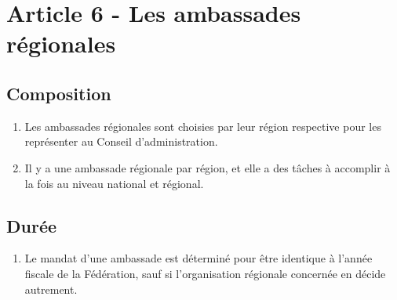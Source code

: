 \section{Article 6 - Les ambassades régionales}
\label{article-6-les-ambassades-regionales}

\subsection{Composition}
\label{composition-1}

\begin{enumerate}
 \item
  Les ambassades régionales sont choisies par leur région respective pour les représenter au Conseil d'administration.
 \item
  Il y a une ambassade régionale par région, et elle a des tâches à accomplir à la fois au niveau national et régional.
\end{enumerate}

\subsection{Durée}
\label{duree-2}

\begin{enumerate}
 \item
  Le mandat d'une ambassade est déterminé pour être identique à l’année fiscale de la Fédération, sauf si l'organisation régionale concernée en décide autrement.
\end{enumerate}
